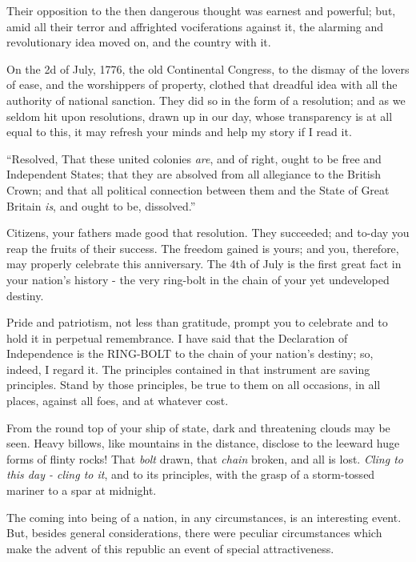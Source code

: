 Their opposition to the then dangerous thought was earnest and powerful; but, amid all their terror and affrighted vociferations against it, the alarming and revolutionary idea moved on, and the country with it.\par

On the 2d of July, 1776, the old Continental Congress, to the dismay of the lovers of ease, and the worshippers of property, clothed that dreadful idea with all the authority of national sanction. They did so in the form of a resolution; and as we seldom hit upon resolutions, drawn up in our day, whose transparency is at all equal to this, it may refresh your minds and help my story if I read it.\par

“Resolved, That these united colonies \textit{are}, and of right, ought to be free and Independent States; that they are absolved from all allegiance to the British Crown; and that all political connection between them and the State of Great Britain \textit{is}, and ought to be, dissolved.”\par

Citizens, your fathers made good that resolution. They succeeded; and to-day you reap the fruits of their success. The freedom gained is yours; and you, therefore, may properly celebrate this anniversary. The 4th of July is the first great fact in your nation’s history - the very ring-bolt in the chain of your yet undeveloped destiny.\par

Pride and patriotism, not less than gratitude, prompt you to celebrate and to hold it in perpetual remembrance. I have said that the Declaration of Independence is the RING-BOLT to the chain of your nation’s destiny; so, indeed, I regard it. The principles contained in that instrument are saving principles. Stand by those principles, be true to them on all occasions, in all places, against all foes, and at whatever cost.\par

From the round top of your ship of state, dark and threatening clouds may be seen. Heavy billows, like mountains in the distance, disclose to the leeward huge forms of flinty rocks! That \textit{bolt} drawn, that \textit{chain} broken, and all is lost. \textit{Cling to this day - cling to it}, and to its principles, with the grasp of a storm-tossed mariner to a spar at midnight.\par

The coming into being of a nation, in any circumstances, is an interesting event. But, besides general considerations, there were peculiar circumstances which make the advent of this republic an event of special attractiveness.\par

